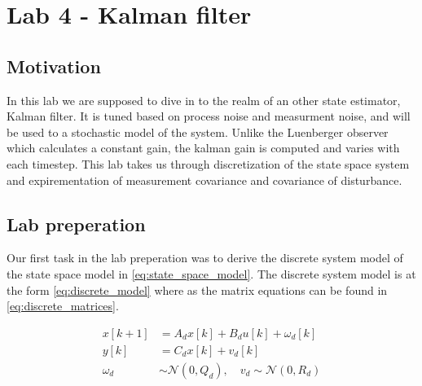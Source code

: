 \section{Lab 4 - Kalman filter}
\subsection{Motivation}
In this lab we are supposed to dive in to the realm of an other state estimator, Kalman filter. It is tuned based on process noise and measurment noise, and will be used to a stochastic model of the system.
Unlike the Luenberger observer which calculates a constant gain, the kalman gain is computed and varies with each timestep. This lab takes us through discretization 
of the state space system and expirementation of measurement covariance and covariance of disturbance. 

\subsection{Lab preperation}
Our first task in the lab preperation was to derive the discrete system model of the state space model in \ref{eq:state_space_model}.
The discrete system model is at the form \ref{eq:discrete_model} where as the matrix equations can be found in \ref{eq:discrete_matrices}.

\begin{subequations}\label{eq:discrete_model}
    \begin{align}
    x[k+1] &= A_d x[k] + B_d u[k] + \omega_d[k] \label{eq:discrete_x} \\
    y[k] &= C_d x[k] + v_d[k] \label{eq:discrete_y} \\
    \omega_d &\sim \mathcal{N}(0, Q_d), \quad v_d \sim \mathcal{N}(0, R_d) \label{eq:discrete_noise}
    \end{align}
\end{subequations}


